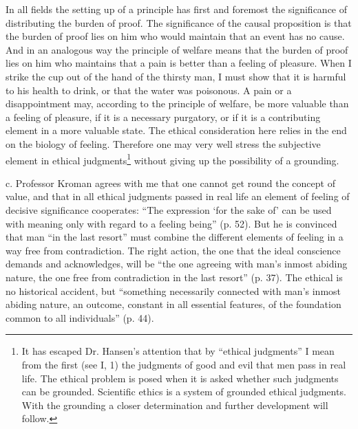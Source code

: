 \documentclass[12pt,a4paper,openany]{book}
\newcommand{\opage}[1]{\marginnote{\footnotesize\textit{[#1]}}}
\begin{document}
In all fields the setting up of a principle has first and foremost the significance of distributing the
burden of proof. The significance of the causal proposition is that the burden of proof lies on him who
would maintain that an event has no cause. And in an analogous way the principle of welfare means that
the burden of proof lies on him who maintains that a pain is better than a feeling of pleasure. When I
strike the cup out of the hand of the thirsty man, I must show that it is harmful to his health to
drink, or that the water was poisonous. A pain or a disappointment may, according to the principle of
welfare, be more valuable than a feeling of pleasure, if it is a necessary purgatory, or if it is a
contributing element in a more valuable state. The ethical consideration here relies in the end on the
biology of feeling. Therefore one may very well stress the subjective element in ethical
judgments\footnote[2]{It has escaped Dr. Hansen's attention that by ``ethical judgments'' I mean from
the first (see I, 1) the judgments of good and evil that men pass in real life. The ethical problem is
posed when it is asked whether such judgments can be grounded. Scientific ethics is a system of grounded
ethical judgments. With the grounding a closer determination and further development will follow.}
without giving up the possibility of a grounding.

\opage{76}c. Professor Kroman agrees with me that one cannot get round the concept of value, and that in all
ethical judgments passed in real life an element of feeling of decisive significance cooperates: ``The
expression `for the sake of' can be used with meaning only with regard to a feeling being'' (p. 52). But
he is convinced that man ``in the last resort'' must combine the different elements of feeling in a way
free from contradiction. The right action, the one that the ideal conscience demands and acknowledges,
will be ``the one agreeing with man's inmost abiding nature, the one free from contradiction in the last
resort'' (p. 37). The ethical is no historical accident, but ``something necessarily connected with
man's inmost abiding nature, an outcome, constant in all essential features, of the foundation common to
all individuals'' (p. 44).
\end{document}
